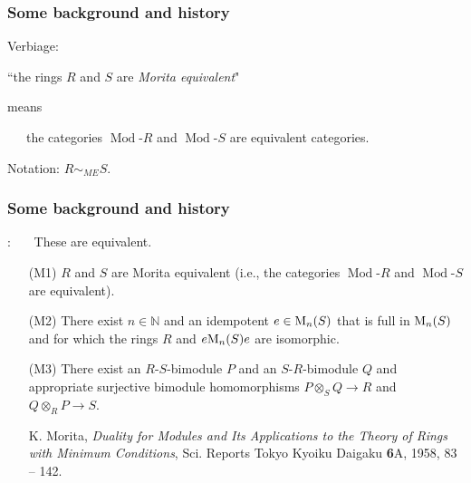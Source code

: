 \documentclass{beamer}
\newcommand{\rmod}[1]{\operatorname{Mod}\text{-}#1}
\newcommand{\N}{\mathbb{N}}
\begin{document}
\begin{frame}
\frametitle{Some background and history}
Verbiage:

\medskip

\qquad \qquad ``the rings $R$ and $S$ are {\it Morita equivalent}" \ \ \ \ 

\bigskip

means

\bigskip

\ \ \  the categories $\rmod{R}$ and $\rmod{S}$ are equivalent categories.  

\bigskip
\bigskip



 Notation:  
$R \sim_{ME} S$.




\end{frame}


\begin{frame}
\frametitle{Some background and history}


: \ \ \ These are equivalent.  

\smallskip


\pause

\begin{itemize}

\item[(M1)]  $R$ and $S$ are Morita equivalent (i.e., the categories $\rmod{R}$ and $\rmod{S}$ are equivalent).  \ \ 
\item[(M2)]  There exist $n\in \N$ and an idempotent $e \in {\rm M}_n(S)$ that is full in ${\rm M}_n(S)$ and for which the rings $R$ and $ e{\rm M}_n(S)e$ are isomorphic.
 
\item[(M3)] There exist an $R$-$S$-bimodule $P$ and an $S$-$R$-bimodule $Q$ and appropriate surjective bimodule homomorphisms  $P \otimes_S Q \to R$ and $Q\otimes_R P \to S$.  

\bigskip

\footnotesize
K. Morita, \emph{Duality for Modules and Its Applications to the Theory of Rings with Minimum Conditions}, Sci. Reports Tokyo Kyoiku Daigaku {\bf 6}A, 1958, 83 -- 142. 
\normalsize
 

\end{itemize}





\end{frame}
\end{document}
